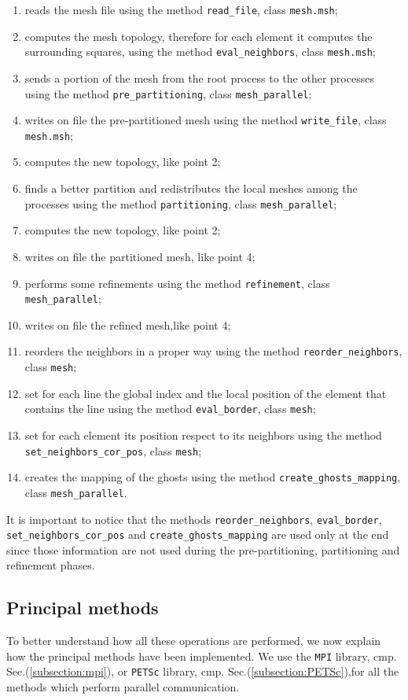 \begin{enumerate}
 \item reads the mesh file using the method \verb|read_file|, class \verb|mesh.msh|;
 \item computes the mesh topology, therefore for each element it computes the surrounding squares, using the method \verb|eval_neighbors|, class \verb|mesh.msh|;
 \item sends a portion of the mesh from the root process to the other processes using the method \verb|pre_partitioning|, class \verb|mesh_parallel|;
 \item writes on file the pre-partitioned mesh using the method \verb|write_file|, class \verb|mesh.msh|;
 \item computes the new topology, like point 2;
 \item finds a better partition and redistributes the local meshes among the processes using the method \verb|partitioning|, class \verb|mesh_parallel|;
 \item computes the new topology, like point 2;
 \item writes on file the partitioned mesh, like point 4;
 \item performs some refinements using the method \verb|refinement|, class \verb|mesh_parallel|;
 \item writes on file the refined mesh,like point 4;
 \item reorders the neighbors in a proper way using the method \verb|reorder_neighbors|, class \verb|mesh|;
 \item set for each line the global index and the local position of the element that contains the line using the method \verb|eval_border|, class \verb|mesh|;
 \item set for each element its position respect to its neighbors using the method \verb|set_neighbors_cor_pos|, class \verb|mesh|;
 \item creates the mapping of the ghosts using the method \verb|create_ghosts_mapping|, class \verb|mesh_parallel|.
\end{enumerate}

It is important to notice that the methods \verb|reorder_neighbors|, \verb|eval_border|, \verb|set_neighbors_cor_pos| and \verb|create_ghosts_mapping| are used only at the end since those information are not used during the pre-partitioning, partitioning and refinement phases.

\subsection{Principal methods}\label{subsection:multi_CPU_methods}
To better understand how all these operations are performed, we now explain how the principal methods have been implemented. We use the \verb|MPI| library, cmp. Sec.(\ref{subsection:mpi}), or \verb|PETSc| library, cmp. Sec.(\ref{subsection:PETSc}),for all the methods which perform parallel communication.

